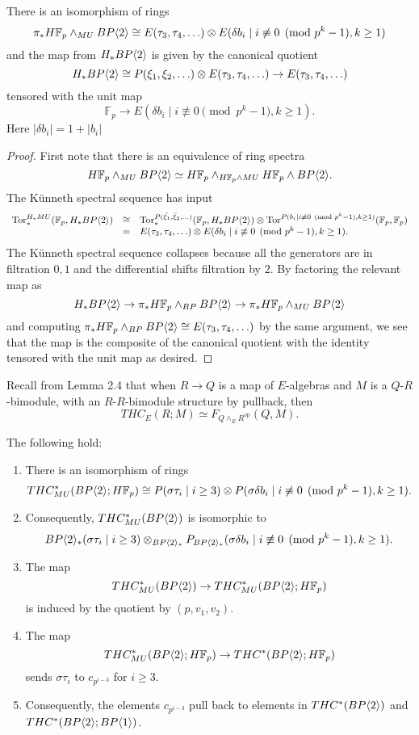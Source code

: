 \begin{lem}
There is an isomorphism of rings 
\[ \pi_*H\mathbb{F}_p\wedge_{MU}BP\langle 2 \rangle \cong  E(\tau_3,\tau_4,\ldots )\otimes E(\delta b_i \mid i\not \equiv 0 \pmod{p^k-1}, k\ge 1) \]
and the map from $H_*BP\langle 2 \rangle$ is given by the canonical quotient 
\[ H_*BP\langle 2 \rangle\cong P(\xi_1,\xi_2,\ldots ) \otimes E(\tau_3,\tau_4,\ldots ) \to E(\tau_3,\tau_4,\ldots )  \]
tensored with the unit map
\[ \mathbb{F}_p \to E(\delta b_i \mid i\not \equiv 0 \pmod{p^k-1}, k\ge 1).\]
Here $|\delta b_i|=1+|b_i|$
\end{lem}
\begin{proof}
First note that there is an equivalence of ring spectra
\[H\mathbb{F}_p\wedge_{MU}BP\langle 2 \rangle \simeq H\mathbb{F}_p\wedge_{H\mathbb{F}_p\wedge MU}H\mathbb{F}_p\wedge BP\langle 2 \rangle.\]
The K\"unneth spectral sequence has input 
\[ 
\begin{array}{rcl}
\operatorname{Tor}_*^{H_*MU}(\mathbb{F}_p, H_*BP\langle 2 \rangle)&\cong& \operatorname{Tor}_*^{P(\bar{\xi_1},\bar{\xi}_2,\ldots )}(\mathbb{F}_p, H_*BP\langle 2 \rangle)\otimes \operatorname{Tor}^{P(  b_i \mid i\not \equiv 0 \pmod{p^k-1}, k\ge 1)}(\mathbb{F}_p,\mathbb{F}_p)\\
&=& E(\tau_3,\tau_4,\ldots )\otimes E( \delta b_i \mid i\not \equiv 0 \pmod{p^k-1}, k\ge 1). 
\end{array}
\]
The K\"unneth spectral sequence collapses because all the generators are in filtration $0,1$ and the differential shifts filtration by $2$. By factoring the relevant map as  
\[H_*BP\langle 2 \rangle\to  \pi_*H\mathbb{F}_p\wedge_{BP}BP\langle 2 \rangle \to \pi_*H\mathbb{F}_p\wedge_{MU}BP\langle 2 \rangle  \]
and computing $\pi_*H\mathbb{F}_p\wedge_{BP}BP\langle 2 \rangle\cong E(\tau_3,\tau_4,\ldots )$ by the same argument, we see that the map is the composite of the canonical quotient 
with the identity tensored with the unit map 
as desired. 
\end{proof}
Recall from Lemma 2.4 \cite{AHL} that when $R\to Q$ is a map of $E$-algebras and $M$ is a $Q$-$R$-bimodule, with an $R$-$R$-bimodule structure by pullback, then 
\[ THC_E(R;M)\simeq F_{Q\wedge_E R^{\text{op}}} (Q,M). \]
\begin{lem} The following hold:
\begin{enumerate}
\item There is an isomorphism of rings 
\[ THC_{MU}^*(BP\langle 2 \rangle;H\mathbb{F}_p)\cong P(\sigma  \tau_i \mid i\ge 3 )\otimes P(\sigma \delta b_i \mid i\not \equiv 0 \pmod{p^k-1}, k\ge 1). \]
\item Consequently, $THC_{MU}^*(BP\langle 2 \rangle)$ is isomorphic to 
\[ BP\langle 2 \rangle_*(\sigma  \tau_i \mid i\ge 3 )\otimes_{BP\langle 2 \rangle_*}P_{BP\langle 2 \rangle_*}(\sigma \delta b_i \mid i\not \equiv 0 \pmod{p^k-1}, k\ge 1).\]
\item The map 
\[ THC_{MU}^*(BP\langle 2 \rangle) \to THC_{MU}^*(BP\langle 2 \rangle;H\mathbb{F}_p)\]
is induced by the quotient by $(p,v_1,v_2)$. 
\item The map 
\[ THC_{MU}^*(BP\langle 2 \rangle;H\mathbb{F}_p) \to THC^*(BP\langle 2 \rangle;H\mathbb{F}_p) \]
sends $\sigma \tau_i$ to $c_{p^{i-3}}$ for $i\ge 3$. 
\item Consequently, the elements 
$c_{p^{i-3}}$ pull back to elements in $THC^*(BP\langle 2 \rangle)$ and $THC^*(BP\langle 2 \rangle;BP\langle 1 \rangle)$.
\end{enumerate}
\end{lem}
